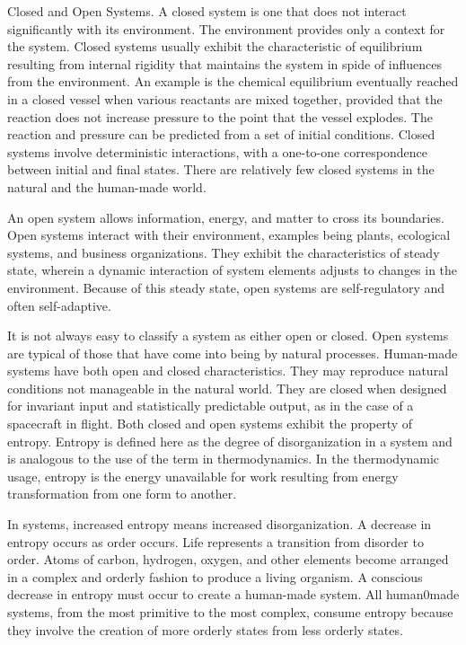 Closed and Open Systems. A closed system is one that does not interact significantly with its environment. The environment provides only a context for the system. Closed systems usually exhibit the characteristic of equilibrium resulting from internal rigidity that maintains the system in spide of influences from the environment. An example is the chemical equilibrium eventually reached in a closed vessel when various reactants are mixed together, provided that the reaction does not increase pressure to the point that the vessel explodes. The reaction and pressure can be predicted from a set of initial conditions. Closed systems involve deterministic interactions, with a one-to-one correspondence between initial and final states. There are relatively few closed systems in the natural and the human-made world.

An open system allows information, energy, and matter to cross its boundaries. Open systems interact with their environment, examples being plants, ecological systems, and business organizations. They exhibit the characteristics of steady state, wherein a dynamic interaction of system elements adjusts to changes in the environment. Because of this steady state, open systems are self-regulatory and often self-adaptive.

It is not always easy to classify a system as either open or closed. Open systems are typical of those that have come into being by natural processes. Human-made systems have both open and closed characteristics. They may reproduce natural conditions not manageable in the natural world. They are closed when designed for invariant input and statistically predictable output, as in the case of a spacecraft in flight.
Both closed and open systems exhibit the property of entropy. Entropy is defined here as the degree of disorganization in a system and is analogous to the use of the term in thermodynamics. In the thermodynamic usage, entropy is the energy unavailable for work resulting from energy transformation from one form to another.

In systems, increased entropy means increased disorganization. A decrease in entropy occurs as order occurs. Life represents a transition from disorder to order. Atoms of carbon, hydrogen, oxygen, and other elements become arranged in a complex and orderly fashion to produce a living organism. A conscious decrease in entropy must occur to create a human-made system. All human0made systems, from the most primitive to the most complex, consume entropy because they involve the creation of more orderly states from less orderly states.

